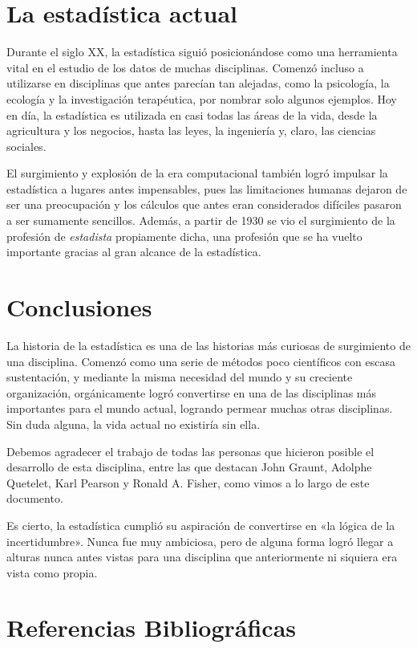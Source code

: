 \documentclass[12pt, a4paper]{article}
\begin{document}
\section{La estadística actual}

Durante el siglo XX, la estadística siguió posicionándose como una herramienta vital en el estudio de los datos de muchas disciplinas. Comenzó incluso a utilizarse en disciplinas que antes parecían tan alejadas, como la psicología, la ecología y la investigación terapéutica, por nombrar solo algunos ejemplos.  Hoy en día, la estadística es utilizada en casi todas las áreas de la vida, desde la agricultura y los negocios, hasta las leyes, la ingeniería y, claro, las ciencias sociales.

El surgimiento y explosión de la era computacional también logró impulsar la estadística a lugares antes impensables, pues las limitaciones humanas dejaron de ser una preocupación y los cálculos que antes eran considerados difíciles pasaron a ser sumamente sencillos. Además, a partir de 1930 se vio el surgimiento de la profesión de \textit{estadista} propiamente dicha, una profesión que se ha vuelto importante gracias al gran alcance de la estadística.

\section{Conclusiones}

La historia de la estadística es una de las historias más curiosas de surgimiento de una disciplina. Comenzó como una serie de métodos poco científicos con escasa sustentación, y mediante la misma necesidad del mundo y su creciente organización, orgánicamente logró convertirse en una de las disciplinas más importantes para el mundo actual, logrando permear muchas otras disciplinas. Sin duda alguna, la vida actual no existiría sin ella.

Debemos agradecer el trabajo de todas las personas que hicieron posible el desarrollo de esta disciplina, entre las que destacan John Graunt, Adolphe Quetelet, Karl Pearson y Ronald A. Fisher, como vimos a lo largo de este documento.

Es cierto, la estadística cumplió su aspiración de convertirse en «la lógica de la incertidumbre». Nunca fue muy ambiciosa, pero de alguna forma logró llegar a alturas nunca antes vistas para una disciplina que anteriormente ni siquiera era vista como propia.

\newpage

\section{Referencias Bibliográficas}
\end{document}

